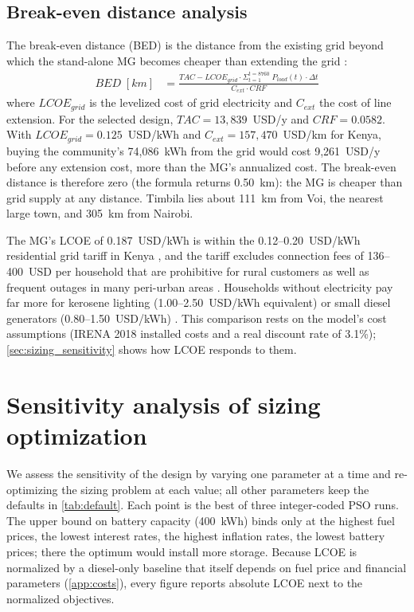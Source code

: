 \documentclass[final,3p,times]{elsarticle}
\begin{document}
\subsection{Break-even distance analysis}

The break-even distance (BED) is the distance from the existing grid beyond which the stand-alone MG becomes cheaper than extending the grid \cite{kaabeche2011a}:
\begin{align*}
    BED \; [km] & = \frac{TAC - LCOE_{grid} \cdot \Sigma_{t=1}^{t=8760}\; P_{load}(t)\cdot \Delta t}{C_{ext} \cdot CRF}
\end{align*}
where $LCOE_{grid}$ is the levelized cost of grid electricity and $C_{ext}$ the cost of line extension. For the selected design, $TAC = 13,839$~USD/y and $CRF = 0.0582$. With $LCOE_{grid} = 0.125$~USD/kWh \cite{LCOEgrid} and $C_{ext} = 157,470$~USD/km \cite{Cext} for Kenya, buying the community's 74,086~kWh from the grid would cost 9,261~USD/y before any extension cost, more than the MG's annualized cost. The break-even distance is therefore zero (the formula returns 0.50~km): the MG is cheaper than grid supply at any distance. Timbila lies about 111~km from Voi, the nearest large town, and 305~km from Nairobi.

The MG's LCOE of 0.187~USD/kWh is within the 0.12--0.20~USD/kWh residential grid tariff in Kenya \cite{LCOEgrid}, and the tariff excludes connection fees of 136--400~USD per household that are prohibitive for rural customers \cite{quak_CBA, golumbeanu2013} as well as frequent outages in many peri-urban areas \cite{iea_africa2019}. Households without electricity pay far more for kerosene lighting (1.00--2.50~USD/kWh equivalent) \cite{tracy2012} or small diesel generators (0.80--1.50~USD/kWh) \cite{quak_CBA}. This comparison rests on the model's cost assumptions (IRENA 2018 installed costs and a real discount rate of 3.1\%); \cref{sec:sizing_sensitivity} shows how LCOE responds to them.

\section{Sensitivity analysis of sizing optimization\label{sec:sizing_sensitivity}}

We assess the sensitivity of the design by varying one parameter at a time and re-optimizing the sizing problem at each value; all other parameters keep the defaults in \cref{tab:default}. Each point is the best of three integer-coded PSO runs. The upper bound on battery capacity (400~kWh) binds only at the highest fuel prices, the lowest interest rates, the highest inflation rates, the lowest battery prices; there the optimum would install more storage. Because LCOE is normalized by a diesel-only baseline that itself depends on fuel price and financial parameters (\cref{app:costs}), every figure reports absolute LCOE next to the normalized objectives.
\end{document}
